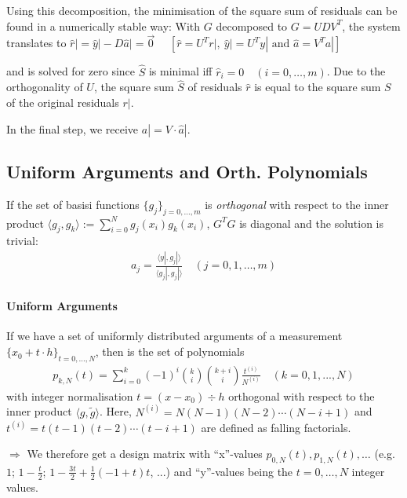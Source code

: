 Using this decomposition, the minimisation of the square sum of residuals can be found in a numerically stable way:
With $G$ decomposed to $G=UDV^T$, the system translates to
\colorbox{shadecolor}{
	$\hat{r}| = \hat{y}| - D\hat{a}| = \vec{0}\quad$
	{\color{darkgray} $\left[\hat{r} = U^Tr|,\ \hat{y}| = U^Ty|\text{ and }\hat{a} = V^Ta|\right]$}
}

and is solved for zero since $\hat{S}$ is minimal iff $\hat{r}_i=0\quad(i=0,\ldots,m)$.
Due to the orthogonality of $U$, the square sum $\hat{S}$ of residuals $\hat{r}$ is equal to the square sum $S$ of the original
residuals $r|$.

In the final step, we receive $a| = V\cdot\hat{a}|$.

\subsection{Uniform Arguments and Orth. Polynomials}

If the set of basisi functions $\{g_j\}_{j=0,\ldots,m}$ is \emph{orthogonal} with respect to the inner product
$\langle g_j,g_k\rangle := \sum_{i=0}^N g_j(x_i)g_k(x_i)$, $G^TG$ is diagonal and the solution is trivial:
\begin{align*}
	a_j=\frac{\langle y|, g_j|\rangle}{\langle g_j|, g_j|\rangle}\quad(j=0,1,\ldots,m)
\end{align*}

\paragraph{Uniform Arguments}
If we have a set of uniformly distributed arguments of a measurement $\{x_0 + t\cdot h\}_{t=0,\ldots,N}$,
then is the set of polynomials
\begin{align*}
	p_{k,N}(t) 
	= \sum_{i=0}^{k}(-1)^{i}{\binom{k}{i}}{\binom{k+i}{i}}{\frac{t^{(i)}}{N^{(i)}}}\quad(k=0,1,...,N)
\end{align*}
with integer normalisation $t = (x-x_0)\div h$ orthogonal with respect to the inner product $\langle g,\tilde{g}\rangle$.
Here, $N^{(i)} = N(N-1)(N-2)\cdots(N-i+1)$ and $t^{(i)} = t(t-1)(t-2)\cdots(t-i+1)$ are defined as falling factorials.

$\Rightarrow$ We therefore get a design matrix with ``x''-values $p_{0,N}(t), p_{1,N}(t),\ldots$
(e.g. $1$; $1-\frac{t}{2}$; $1-\frac{3t}{2}+\frac{1}{2}(-1+t)t$, ...) and ``y''-values being the $t=0,\ldots,N$ integer values.

























